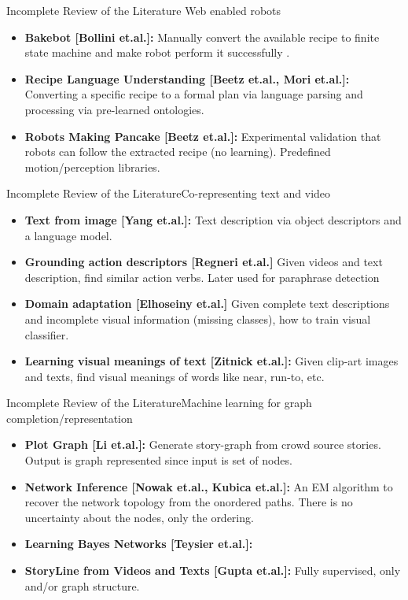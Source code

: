 \begin{frame}{Incomplete Review of the Literature}{ Web enabled robots}
\begin{itemize}
\item {\bf Bakebot [Bollini et.al.]:} Manually convert the available recipe to finite state machine and make robot perform it successfully .
\item {\bf Recipe Language Understanding [Beetz et.al., Mori et.al.]:} Converting a specific recipe to a formal plan via language parsing and processing via pre-learned ontologies.
\item {\bf Robots Making Pancake [Beetz et.al.]:} Experimental validation that robots can follow the extracted recipe (no learning). Predefined motion/perception libraries.
\end{itemize}
\end{frame}


\begin{frame}{Incomplete Review of the Literature}{Co-representing text and video}
\begin{itemize}
\item {\bf Text from image [Yang et.al.]:} Text description via object descriptors and a language model.
\item {\bf Grounding action descriptors [Regneri et.al.]} Given videos and text description, find similar action verbs. Later used for paraphrase detection
\item {\bf Domain adaptation [Elhoseiny et.al.]} Given complete text descriptions and incomplete visual information (missing classes), how to train visual classifier. 
\item {\bf Learning visual meanings of text [Zitnick et.al.]:} Given clip-art images and texts, find visual meanings of words like near, run-to, etc.
\end{itemize}
\end{frame}

\begin{frame}{Incomplete Review of the Literature}{Machine learning for graph completion/representation}
\begin{itemize}
\item {\bf Plot Graph [Li et.al.]:} Generate story-graph from crowd source stories. Output is graph represented 
since input is set of nodes.
\item {\bf Network Inference [Nowak et.al., Kubica et.al.]:} An EM algorithm to recover the network topology from the onordered paths. There is no uncertainty about the nodes, only the ordering.
\item {\bf Learning Bayes Networks [Teysier et.al.]:}
\item {\bf StoryLine from Videos and Texts [Gupta et.al.]:} Fully supervised, only and/or graph structure. 
\end{itemize}
\end{frame}


